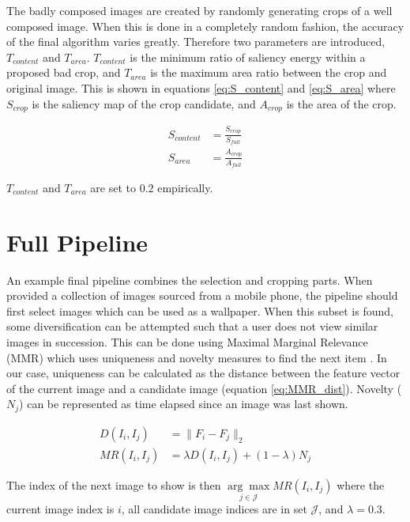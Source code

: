 The badly composed images are created by randomly generating crops of a well
composed image.
When this is done in a completely random fashion, the accuracy of the final
algorithm varies greatly.
Therefore two parameters are introduced, $T_{content}$ and $T_{area}$.
$T_{content}$ is the minimum ratio of saliency energy within a proposed bad
crop, and $T_{area}$ is the maximum area ratio between the crop and original
image.
This is shown in equations \ref{eq:S_content} and \ref{eq:S_area} where
$S_{crop}$ is the saliency map of the crop candidate, and $A_{crop}$ is the area
of the crop.

\begin{align}
	S_{content} &= \frac{S_{crop}}{S_{full}}	\label{eq:S_content}\\
	S_{area}    &= \frac{A_{crop}}{A_{full}}	\label{eq:S_area}
\end{align}

$T_{content}$ and $T_{area}$ are set to $0.2$ empirically.


\section{Full Pipeline}

An example final pipeline combines the selection and cropping parts.
When provided a collection of images sourced from a mobile phone, the pipeline
should first select images which can be used as a wallpaper.
When this subset is found, some diversification can be attempted such that a
user does not view similar images in succession.
This can be done using Maximal Marginal Relevance (MMR) which uses uniqueness
and novelty measures to find the next item \cite{carbonell1998use}.
In our case, uniqueness can be calculated as the distance between the feature
vector of the current image and a candidate image (equation \ref{eq:MMR_dist}).
Novelty ($N_j$) can be represented as time elapsed since an image was last shown.

\begin{align}
	D(I_i, I_j)  &= \|F_i - F_j\|_2                       \label{eq:MMR_dist} \\
	MR(I_i, I_j) &= \lambda D(I_i, I_j) + (1-\lambda) N_j
\end{align}

The index of the next image to show is then $\underset{j\in\mathcal{J}}{\arg\max}MR(I_i, I_j)$
where the current image index is $i$, all candidate image indices are in set
$\mathcal{J}$, and $\lambda=0.3$.

